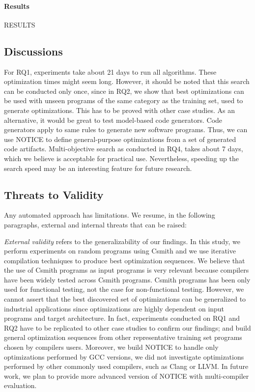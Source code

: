 \paragraph{Results}
RESULTS

\noindent{}
\subsection{Discussions}
For RQ1, experiments take about 21 days to run all algorithms. These optimization times might seem long. However, it should be noted that this search can be conducted only once, since in RQ2, we show that best optimizations can be used with unseen programs of the same category as the training set, used to generate optimizations. This has to be proved with other case studies. As an alternative, it would be great to test model-based code generators. Code generators apply to same rules to generate new software programs. Thus, we can use NOTICE to define general-purpose optimizations from a set of generated code artifacts. 
Multi-objective search as conducted in RQ4, takes about 7 days, which we believe is acceptable for practical use. Nevertheless, speeding up the search speed
may be an interesting feature for future research.



\subsection{Threats to Validity}
Any automated approach has limitations. We resume, in the following paragraphs, external and internal threats that can be raised:
 
\textit{External validity} refers to the generalizability of our findings. In this study, we perform experiments on random programs using Csmith and we use iterative compilation techniques to produce best optimization sequences. We believe that the use of Csmith programs as input programs is very relevant because compilers have been widely tested across Csmith programs\cite{chen2016empirical,yang2011finding}. Csmith programs has been only used for functional testing, not the case for non-functional testing. However, we cannot assert that the best discovered set of optimizations can be generalized to industrial applications since optimizations are highly dependent on input programs and target architecture. In fact, experiments conducted on RQ1 and RQ2 have to be replicated to other case studies to confirm our findings; and build general optimization sequences from other representative training set programs chosen by compilers users.
Moreover, we build NOTICE to handle only optimizations performed by GCC versions, we did not investigate optimizations performed by other commonly used compilers, such as Clang or LLVM. In future work, we plan to provide more advanced version of NOTICE with multi-compiler evaluation.

